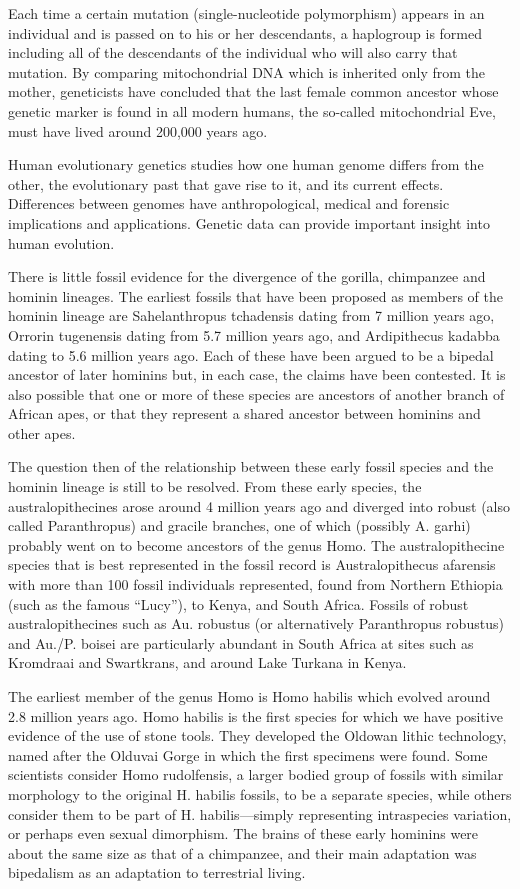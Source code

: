 Each time a certain mutation (single-nucleotide polymorphism) appears in an individual and is passed on to his or her descendants, a haplogroup is formed including all of the descendants of the individual who will also carry that mutation. By comparing mitochondrial DNA which is inherited only from the mother, geneticists have concluded that the last female common ancestor whose genetic marker is found in all modern humans, the so-called mitochondrial Eve, must have lived around 200,000 years ago.

Human evolutionary genetics studies how one human genome differs from the other, the evolutionary past that gave rise to it, and its current effects. Differences between genomes have anthropological, medical and forensic implications and applications. Genetic data can provide important insight into human evolution.

There is little fossil evidence for the divergence of the gorilla, chimpanzee and hominin lineages. The earliest fossils that have been proposed as members of the hominin lineage are Sahelanthropus tchadensis dating from 7 million years ago, Orrorin tugenensis dating from 5.7 million years ago, and Ardipithecus kadabba dating to 5.6 million years ago. Each of these have been argued to be a bipedal ancestor of later hominins but, in each case, the claims have been contested. It is also possible that one or more of these species are ancestors of another branch of African apes, or that they represent a shared ancestor between hominins and other apes.

The question then of the relationship between these early fossil species and the hominin lineage is still to be resolved. From these early species, the australopithecines arose around 4 million years ago and diverged into robust (also called Paranthropus) and gracile branches, one of which (possibly A. garhi) probably went on to become ancestors of the genus Homo. The australopithecine species that is best represented in the fossil record is Australopithecus afarensis with more than 100 fossil individuals represented, found from Northern Ethiopia (such as the famous ``Lucy''), to Kenya, and South Africa. Fossils of robust australopithecines such as Au. robustus (or alternatively Paranthropus robustus) and Au./P. boisei are particularly abundant in South Africa at sites such as Kromdraai and Swartkrans, and around Lake Turkana in Kenya.

The earliest member of the genus Homo is Homo habilis which evolved around 2.8 million years ago. Homo habilis is the first species for which we have positive evidence of the use of stone tools. They developed the Oldowan lithic technology, named after the Olduvai Gorge in which the first specimens were found. Some scientists consider Homo rudolfensis, a larger bodied group of fossils with similar morphology to the original H. habilis fossils, to be a separate species, while others consider them to be part of H. habilis---simply representing intraspecies variation, or perhaps even sexual dimorphism. The brains of these early hominins were about the same size as that of a chimpanzee, and their main adaptation was bipedalism as an adaptation to terrestrial living.

